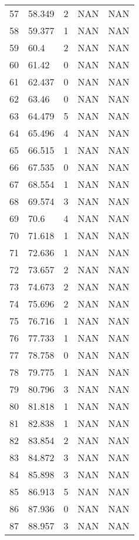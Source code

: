 \documentclass{article}
\begin{document}
\begin{longtable}{@{}lllll@{}}
					57  & 58.349  & 2     & NAN   & NAN   \\
					58  & 59.377  & 1     & NAN   & NAN   \\
					59  & 60.4    & 2     & NAN   & NAN   \\
					60  & 61.42   & 0     & NAN   & NAN   \\
					61  & 62.437  & 0     & NAN   & NAN   \\
					62  & 63.46   & 0     & NAN   & NAN   \\
					63  & 64.479  & 5     & NAN   & NAN   \\
					64  & 65.496  & 4     & NAN   & NAN   \\
					65  & 66.515  & 1     & NAN   & NAN   \\
					66  & 67.535  & 0     & NAN   & NAN   \\
					67  & 68.554  & 1     & NAN   & NAN   \\
					68  & 69.574  & 3     & NAN   & NAN   \\
					69  & 70.6    & 4     & NAN   & NAN   \\
					70  & 71.618  & 1     & NAN   & NAN   \\
					71  & 72.636  & 1     & NAN   & NAN   \\
					72  & 73.657  & 2     & NAN   & NAN   \\
					73  & 74.673  & 2     & NAN   & NAN   \\
					74  & 75.696  & 2     & NAN   & NAN   \\
					75  & 76.716  & 1     & NAN   & NAN   \\
					76  & 77.733  & 1     & NAN   & NAN   \\
					77  & 78.758  & 0     & NAN   & NAN   \\
					78  & 79.775  & 1     & NAN   & NAN   \\
					79  & 80.796  & 3     & NAN   & NAN   \\
					80  & 81.818  & 1     & NAN   & NAN   \\
					81  & 82.838  & 1     & NAN   & NAN   \\
					82  & 83.854  & 2     & NAN   & NAN   \\
					83  & 84.872  & 3     & NAN   & NAN   \\
					84  & 85.898  & 3     & NAN   & NAN   \\
					85  & 86.913  & 5     & NAN   & NAN   \\
					86  & 87.936  & 0     & NAN   & NAN   \\
					87  & 88.957  & 3     & NAN   & NAN   \\

\end{longtable}
\end{document}
